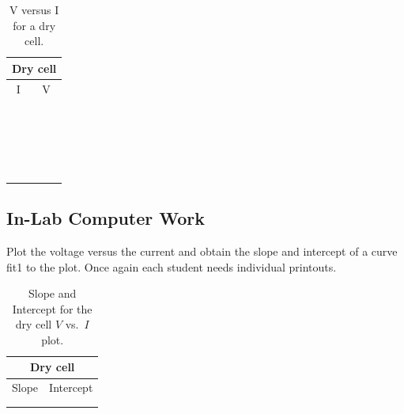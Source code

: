 \begin{table}[htb]
\begin{center}
\begin{tabular}{|c|c|}
\hline
\multicolumn{2}{|c|}{Dry cell}\\
\hline
I & V \\
\hline
\hspace*{5cm} & \hspace*{5cm} \\
& \\
\hline
& \\
& \\
\hline
& \\
& \\
\hline
& \\
& \\
\hline
& \\
& \\
\hline
& \\
& \\
\hline
& \\
& \\
\hline
& \\
& \\
\hline
& \\
& \\
\hline
& \\
& \\
\hline
\end{tabular}
\end{center}
\caption{V versus I for a dry cell.}
\label{tab:DC:DryCell}
\end{table}
\clearpage

\subsection{In-Lab Computer Work}
Plot the voltage versus the current and obtain the slope and intercept of a
curve fit1 to the plot.  Once again each student needs individual printouts. 
\begin{table}[htb]
\begin{center}
\begin{tabular}{|c|c|}
\hline
\multicolumn{2}{|c|}{Dry cell} \\
\hline
Slope & Intercept \\
\hline
\hspace*{5cm} & \hspace*{5cm} \\
& \\
\hline
\end{tabular}
\end{center}
\caption{Slope and Intercept for the dry cell $V$ vs.\ $I$ plot.}
\end{table}

